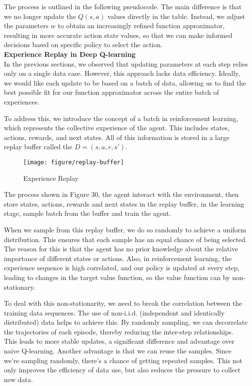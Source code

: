 \documentclass{article}
\begin{document}
The process is outlined in the following pseudocode. The main difference is that we no longer update the $Q(s,a)$ values directly in the table. Instead, we adjust the parameters $w$ to obtain an increasingly refined function approximator, resulting in more accurate action state values, so that we can make informed decisions based on specific policy to select the action. \\ %


\noindent
\textbf{Experience Replay in Deep Q-learning}\\
\noindent
In the previous sections, we observed that updating parameters at each step relies only on a single data case. However, this approach lacks data efficiency. Ideally, we would like each update to be based on a batch of data, allowing us to find the best possible fit for our function approximator across the entire batch of experiences.

To address this, we introduce the concept of a batch in reinforcement learning, which represents the collective experience of the agent. This includes states, actions, rewards, and next states. All of this information is stored in a large replay buffer called the $D = {(s,a,r,s')}$.

\begin{figure}[htbp]
        \centering
        \texttt{[image: figure/replay-buffer]}
        \caption{Experience Replay}
\end{figure}

The process shown in Figure 30, the agent interact with the environment, then store states, actions, rewards and next states in the replay buffer, in the learning stage, sample batch from the buffer and train the agent.


When we sample from this replay buffer, we do so randomly to achieve a uniform distribution. This ensures that each sample has an equal chance of being selected. The reason for this is that the agent has no prior knowledge about the relative importance of different states or actions. Also, in reinforcement learning, the experience sequence is high correlated, and our policy is updated at every step, leading to changes in the target value function, so the value function can by non-stationary.

To deal with this non-stationarity, we need to break the correlation between the training data sequences. The use of non-i.i.d. (independent and identically distributed) data helps to achieve this. By randomly sampling, we can decorrelate the trajectories of each episode, thereby reducing the inter-step relationships. This leads to more stable updates, a significant difference and advantage over naive Q-learning. Another advantage is that we can reuse the samples. Since we're sampling randomly, there's a chance of getting repeated samples. This not only improves the efficiency of data use, but also reduces the pressure to collect new data.\\
\end{document}
